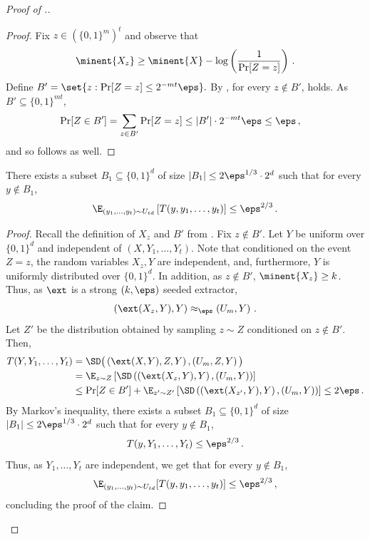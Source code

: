 \documentclass{toc}
\begin{document}
\begin{proof}[Proof of .]
\begin{proof}
%
	
	Fix $z\in (\{0,1\}^m)^t$ and observe that  
	\begin{equation}\label{eq: condition min entropy loss delta}
		\minent{ X_{z}} \geq \minent{X} - \log\left(\frac{1}{\Pr[Z = z]}\right)\,.
	\end{equation}
	Define
	$
	B' = \set{z : \Pr[Z = z] \le 2^{-mt}  \eps}.
	$
	By , for every $z \notin B'$,  holds.
 	As $B' \subseteq \{0,1\}^{mt}$,
\begin{align*}
	\Pr[Z\in B'] &= \sum_{z \in B'}\Pr[Z = z] 
	\leq |B'| \cdot 2^{-mt}  \eps \le \eps\,,
\end{align*}
and so  follows as well.
\end{proof}

\begin{claim}\label{claim:average behavior}
There exists a subset $B_1 \subseteq \{0,1\}^d$ of size $|B_1| \le 2\eps^{1/3} \cdot 2^d$ such that for every $y \notin B_1$,
\[
\E_{(y_1,\ldots,y_t) \sim U_{td}}\left[T(y,y_1,\ldots,y_t)\right] \le \eps^{2/3}\,.
\]
\end{claim}

\begin{proof}
Recall the definition of $X_{z}$ and $B'$ from . 
Fix $z \not\in B'$. Let $Y$ be uniform over $\{0,1\}^d$ and independent of $(X,Y_1,\ldots, Y_t)$. Note that conditioned on the event $Z = z$, the random variables $X_{z}, Y$ are independent, and, furthermore, $Y$ is uniformly distributed over $\{0,1\}^d$. In addition, as $z \not\in B'$, $\minent{X_{z}} \ge k$. Thus, as $\ext$ is a strong $(k,\eps)$ seeded extractor,
\[
\left( \ext(X_{z},Y), Y \right) \approx_\eps \left( U_m, Y \right)\,.
\]
Let $Z'$ be the distribution obtained by sampling $z \sim Z$ conditioned on $z \notin B'$. Then,
\begin{align*}
T(Y,Y_1,\ldots,Y_t) &= \SD\big( \left(\ext(X,Y), Z , Y \right),  \left(U_m, Z, Y\right) \big) \\
&= \E_{z \sim Z} \left[ \SD\left( \left(\ext(X_{z},Y), Y \right),
          \left(U_m, Y \right)
   \right) \right] \\
&\le \Pr[Z \in B'] + \E_{z' \sim Z'}\left[ \SD\left( \left(\ext(X_{z'},Y), Y \right),
          \left(U_m, Y \right)
   \right) \right] \le 2\eps\,.
\end{align*}
By Markov's inequality, there exists a subset $B_1 \subseteq \{0,1\}^d$ of size $|B_1| \le 2\eps^{1/3} \cdot 2^d$ such that for every $y \notin B_1$,
\[
T(y,Y_1,\ldots,Y_t) \leq \eps^{2/3}\,.
\]
Thus, as $Y_1,\ldots, Y_t$ are independent, we get that for every $y \notin B_1$,
\[
\E_{(y_1,\ldots,y_t) \sim U_{td}}[T(y,y_1,\ldots,y_t)] \le \eps^{2/3}\,,
\]
concluding the proof of the claim.
\end{proof}


\end{proof}
\end{document}
